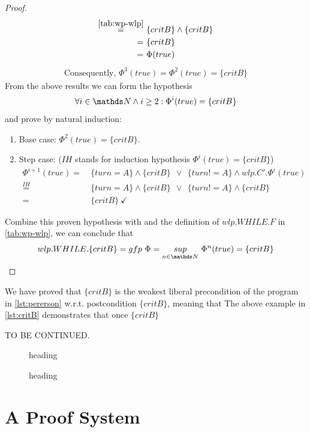 \begin{proof}
\begin{align*}
		\overset{\autoref{tab:wp-wlp}}{=}&\ \{critB\}\wedge\{critB\}\\
		=&\ \{critB\}\\
		=&\ \Phi(true)\\
	\end{align*}
	\vspace{-15mm}
	\begin{align*}
		\text{Consequently, } \Phi^3(true) = \Phi^2(true) = \{critB\}
	\end{align*}
	From the above results we can form the hypothesis
	$$\forall i\in\N\wedge i\geq 2: \Phi^i(true)=\{critB\}$$
	and prove by natural induction: 
	\begin{enumerate}
		\item Base case: $\Phi^2(true) = \{critB\}$. \checkmark
		\item Step case: ($IH$ stands for induction hypothesis $\Phi^i(true)=\{critB\}$)
		\begin{align*}
			\Phi^{i+1}(true) =&\ \{turn=A\}\wedge \{critB\}\ \ \vee\ \ \{turn!=A\} \wedge wlp.C'.\Phi^i(true) \\ 
			\overset{IH}{=}&\ \{turn=A\}\wedge \{critB\}\ \ \vee\ \ \{turn!=A\} \wedge \{critB\} \\
			=&\ \{critB\}\ \checkmark
		\end{align*} 
	\end{enumerate}
	Combine this proven hypothesis with  and the definition of $wlp.WHILE.F$ in \autoref{tab:wp-wlp}, we can conclude that 
	$$wlp.WHILE.\{critB\}=gfp\ \Phi = \underset{n\in\N}{sup}\ \Phi^n(true) = \{critB\}$$

\end{proof}

We have proved that $\{critB\}$ is the weakest liberal precondition of the program in \autoref{lst:pererson} w.r.t. postcondition $\{critB\}$, meaning that 
The above example in \autoref{lst:critB} demonstrates that once $\{critB\}$ 

TO BE CONTINUED.

\begin{figure}[ht]
	\centering
	
	\label{fig:critB}
	\caption{heading}
\end{figure}

\begin{figure}[ht]
	\centering
	
	\label{fig:critMore}
	\caption{heading}
\end{figure}

\newpage
\section{A Proof System}





